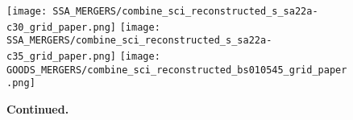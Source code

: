 \documentclass[fleqn,usenatbib]{mnras}
\begin{document}
\begin{figure*}\ContinuedFloat
    \centering

    \texttt{[image: SSA\_MERGERS/combine\_sci\_reconstructed\_s\_sa22a-c30\_grid\_paper.png]}
    \texttt{[image: SSA\_MERGERS/combine\_sci\_reconstructed\_s\_sa22a-c35\_grid\_paper.png]}
    \texttt{[image: GOODS\_MERGERS/combine\_sci\_reconstructed\_bs010545\_grid\_paper.png]}


    \caption{\textbf{Continued.}}

\end{figure*}


\bsp    %
\label{lastpage}
\end{document}
